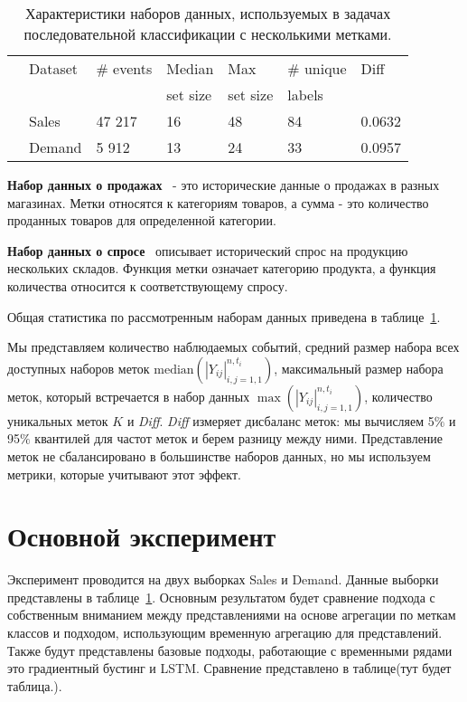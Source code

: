 \documentclass[a4paper, 12pt]{article} %
\begin{document}
\begin{table}[t!]
\centering
\begin{tabular}{p{0.3cm}p{2.2cm}p{1.7cm}p{1.6cm}p{1.6cm}p{1.8cm}p{1.1cm}}
\hline
& Dataset & \# events & Median & Max & \# unique & Diff \\
& &  & set size & set size &  labels \\
\hline
& Sales & 47 217 & 16 & 48  & 84 & 0.0632 \\
& Demand & 5 912 & 13 & 24  & 33 & 0.0957 \\
\hline
\end{tabular}
\caption{Характеристики наборов данных, используемых в задачах последовательной классификации с несколькими метками.}
\label{tab:multi_datasets}
\end{table}

\textbf{Набор данных о продажах}~\cite{sales} - это исторические данные о продажах в разных магазинах. Метки относятся к категориям товаров, а сумма - это количество проданных товаров для определенной категории. 

\textbf{Набор данных о спросе}~\cite{demand} описывает исторический спрос на продукцию нескольких складов. Функция метки означает категорию продукта, а функция количества относится к соответствующему спросу.

Общая статистика по рассмотренным наборам данных приведена в таблице~\ref{tab:multi_datasets}.

Мы представляем количество наблюдаемых событий, средний размер набора всех доступных наборов меток $\mathrm{median}({|Y_{ij}|}_{i, j = 1, 1}^{n, t_i})$, максимальный размер набора меток, который встречается в набор данных $\max({|Y_{ij}|}_{i, j = 1, 1}^{n, t_i})$, количество уникальных меток $K$ и \textit{Diff}. 
\textit{Diff} измеряет дисбаланс меток: мы вычисляем 5$\%$ и 95$\%$ квантилей для частот меток и берем разницу между ними.
Представление меток не сбалансировано в большинстве наборов данных, но мы используем метрики, которые учитывают этот эффект.

\section{Основной эксперимент}
Эксперимент проводится на двух выборках Sales и Demand. Данные выборки представлены в таблице~\ref{tab:multi_datasets}. Основным результатом будет сравнение подхода  с собственным вниманием между представлениями на основе агрегации по меткам классов и подходом, использующим временную агрегацию для представлений. Также будут представлены базовые подходы, работающие с временными рядами это градиентный бустинг и LSTM. Сравнение представлено в таблице(тут будет таблица.).  
\end{document}
